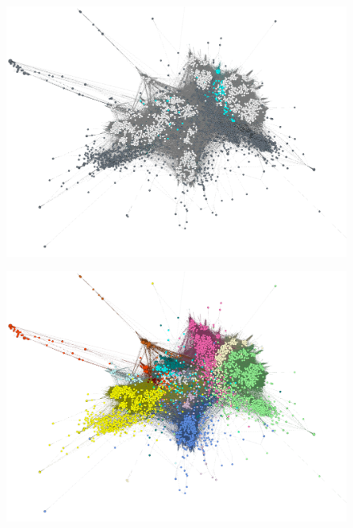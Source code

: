 \begin{landscape}
\thispagestyle{plain}
\begin{figure}
\vspace{-2cm}
\hspace{-2cm}
\begin{minipage}[t]{0.5\linewidth}
\includegraphics[width=1.13\textwidth ]{./img/graph_all_grey_white_cyan.png}
\label{figrepltype}
\end{minipage}
\hspace{1.5cm}
\begin{minipage}[t]{0.5\linewidth}
\includegraphics[width=1.13\textwidth ]{./img/graph_all_taxa_color_whitefont.png}
\label{figreplphyl}

\end{minipage}
\end{figure}
\end{landscape}
